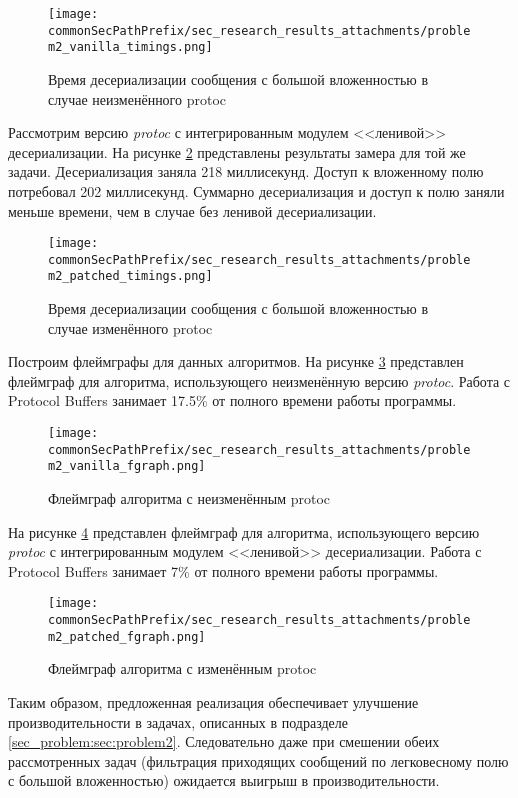 \begin{figure}[H]
    \centering
    \texttt{[image: \\commonSecPathPrefix/sec\_research\_results\_attachments/problem2\_vanilla\_timings.png]}
    \caption{Время десериализации сообщения с большой вложенностью в случае неизменённого protoc}
    \label{fig:problem2_vanilla_timings}
\end{figure}

Рассмотрим версию \textit{protoc} с интегрированным модулем <<ленивой>> десериализации.
На рисунке \ref{fig:problem2_patched_timings} представлены результаты замера для той же задачи. Десериализация заняла 218 миллисекунд. Доступ к вложенному полю потребовал 202 миллисекунд. Суммарно десериализация и доступ к полю заняли меньше времени, чем в случае без ленивой десериализации.

\begin{figure}[H]
    \centering
    \texttt{[image: \\commonSecPathPrefix/sec\_research\_results\_attachments/problem2\_patched\_timings.png]}
    \caption{Время десериализации сообщения с большой вложенностью в случае изменённого protoc}
    \label{fig:problem2_patched_timings}
\end{figure}

Построим флеймграфы для данных алгоритмов.
На рисунке \ref{fig:problem2_vanilla_fgraph} представлен флеймграф для алгоритма, использующего неизменённую версию \textit{protoc}. 
Работа с Protocol Buffers занимает 17.5\% от полного времени работы программы.

\begin{figure}[H]
    \centering
    \texttt{[image: \\commonSecPathPrefix/sec\_research\_results\_attachments/problem2\_vanilla\_fgraph.png]}
    \caption{Флеймграф алгоритма с неизменённым protoc}
    \label{fig:problem2_vanilla_fgraph}
\end{figure}

На рисунке \ref{fig:problem2_patched_fgraph} представлен флеймграф для алгоритма, использующего версию \textit{protoc} с интегрированным модулем <<ленивой>> десериализации. 
Работа с Protocol Buffers занимает 7\% от полного времени работы программы.

\begin{figure}[H]
    \centering
    \texttt{[image: \\commonSecPathPrefix/sec\_research\_results\_attachments/problem2\_patched\_fgraph.png]}
    \caption{Флеймграф алгоритма с изменённым protoc}
    \label{fig:problem2_patched_fgraph}
\end{figure}

Таким образом, предложенная реализация обеспечивает улучшение производительности в задачах, описанных в подразделе \ref{sec_problem:sec:problem2}.
Следовательно даже при смешении обеих рассмотренных задач (фильтрация приходящих сообщений по легковесному полю с большой вложенностью) ожидается выигрыш в производительности.
